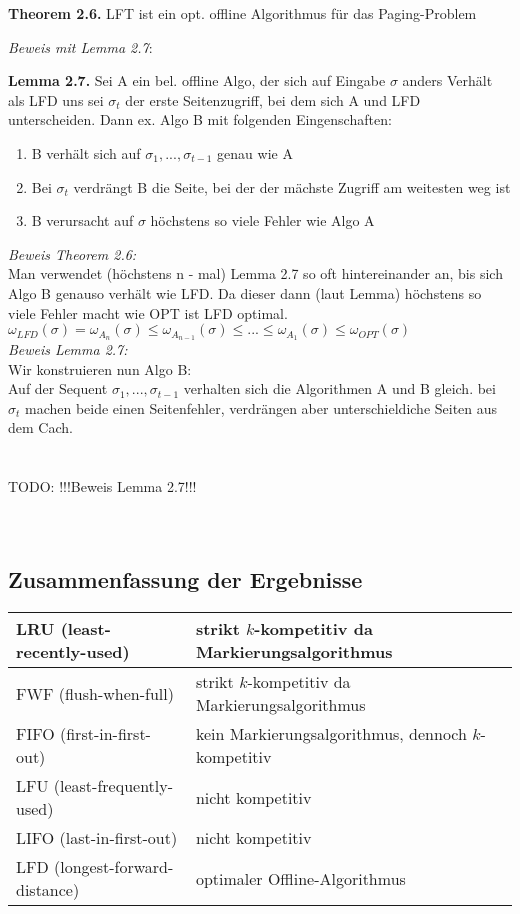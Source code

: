 \documentclass[a4paper]{report}
\begin{document}
\textbf{Theorem 2.6.} LFT ist ein opt. offline Algorithmus für das Paging-Problem

\textit{Beweis mit Lemma 2.7}:

\textbf{Lemma 2.7.} Sei A ein bel. offline Algo, der sich auf Eingabe $\sigma$ anders Verhält als LFD uns sei $\sigma_{t}$ der erste Seitenzugriff, bei dem sich A und LFD unterscheiden. Dann ex. Algo B mit folgenden Eingenschaften:
\begin{enumerate}
\item B verhält sich auf $\sigma_{1}, ..., \sigma_{t - 1}$ genau wie A
\item Bei $\sigma_{t}$ verdrängt B die Seite, bei der der mächste Zugriff am weitesten weg ist
\item B verursacht auf $\sigma$ höchstens so viele Fehler wie Algo A
\end{enumerate}

\textit{Beweis Theorem 2.6:}\\
Man verwendet (höchstens n - mal) Lemma 2.7 so oft hintereinander an, bis sich Algo B genauso verhält wie LFD. Da dieser dann (laut Lemma) höchstens so viele Fehler macht wie OPT ist LFD optimal.\\
$\omega_{LFD}(\sigma) = \omega_{A_{n}}(\sigma) \le \omega_{A_{n-1}}(\sigma) \le ... \le \omega_{A_{1}}(\sigma) \le \omega_{OPT}(\sigma)$ \\

\textit{Beweis Lemma 2.7:}\\
Wir konstruieren nun Algo B: \\
Auf der Sequent $\sigma_{1}, ..., \sigma_{t-1}$ verhalten sich die Algorithmen A und B gleich. bei $\sigma_{t}$ machen beide einen Seitenfehler, verdrängen aber unterschieldiche Seiten aus dem Cach.
\\
\\
\\
TODO: !!!Beweis Lemma 2.7!!!
\\
\\
\\

\subsection{Zusammenfassung der Ergebnisse}

\begin{tabular}{| l | l |}
\hline
LRU (least-recently-used)   & strikt $k$-kompetitiv da Markierungsalgorithmus \\ \hline
FWF (flush-when-full)     & strikt $k$-kompetitiv da Markierungsalgorithmus \\ \hline
FIFO (first-in-first-out)   & kein Markierungsalgorithmus, dennoch $k$-kompetitiv \\ \hline
LFU (least-frequently-used)   & nicht kompetitiv\\ \hline
LIFO (last-in-first-out)    & nicht kompetitiv\\ \hline
LFD (longest-forward-distance)& optimaler Offline-Algorithmus \\ \hline
\end{tabular}
\end{document}
